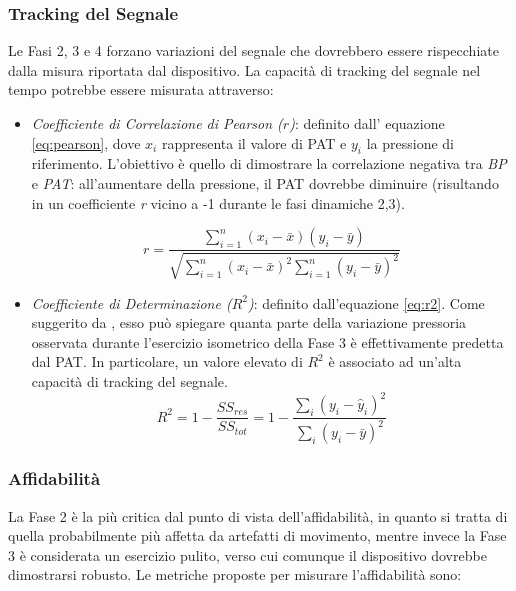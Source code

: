 \documentclass[11pt,a4paper]{article}
\begin{document}
\subsubsection{Tracking del Segnale}
Le Fasi 2, 3 e 4 forzano variazioni del segnale che dovrebbero essere rispecchiate dalla misura riportata dal dispositivo. La capacità di tracking del segnale nel tempo potrebbe essere misurata attraverso:
\begin{itemize}
    \item \textit{Coefficiente di Correlazione di Pearson ($r$)}: definito dall' equazione \eqref{eq:pearson}, dove $x_i$ rappresenta il valore di PAT e $y_i$ la pressione di riferimento. L'obiettivo è quello di dimostrare la correlazione negativa tra \textit{BP} e \textit{PAT}: all'aumentare della pressione, il PAT dovrebbe diminuire (risultando in un coefficiente \textit{r} vicino a -1 durante le fasi dinamiche 2,3).

    \begin{equation}
        r = \frac{\sum_{i=1}^{n} (x_i - \bar{x})(y_i - \bar{y})}{\sqrt{\sum_{i=1}^{n} (x_i - \bar{x})^2 \sum_{i=1}^{n} (y_i - \bar{y})^2}}
        \label{eq:pearson}
    \end{equation}
    
    
    \item \textit{Coefficiente di Determinazione ($R^2$)}: definito dall'equazione \eqref{eq:r2}. Come suggerito da \cite{lazazzera2019}, esso può spiegare quanta parte della variazione pressoria osservata durante l'esercizio isometrico della Fase 3 è effettivamente predetta dal PAT. In particolare, un valore elevato di $R^2$ è associato ad un'alta capacità di tracking del segnale.
    \begin{equation}
        R^2 = 1 - \frac{SS_{res}}{SS_{tot}} = 1 - \frac{\sum_{i} (y_i - \hat{y}_i)^2}{\sum_{i} (y_i - \bar{y})^2}
        \label{eq:r2}
    \end{equation}
\end{itemize}

\subsubsection{Affidabilità}
La Fase 2 è la più critica dal punto di vista dell'affidabilità, in quanto si tratta di quella probabilmente più affetta da artefatti di movimento, mentre invece la Fase 3 è considerata un esercizio pulito, verso cui comunque il dispositivo dovrebbe dimostrarsi robusto. Le metriche proposte per misurare l'affidabilità sono:
\end{document}
